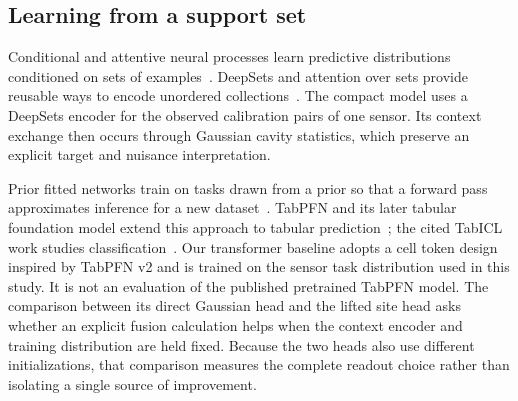 \subsection{Learning from a support set}

Conditional and attentive neural processes learn predictive distributions conditioned on sets of examples~\citep{garnelo2018cnp,kim2019anp}. DeepSets and attention over sets provide reusable ways to encode unordered collections~\citep{zaheer2017deepsets,lee2019settransformer}. The compact model uses a DeepSets encoder for the observed calibration pairs of one sensor. Its context exchange then occurs through Gaussian cavity statistics, which preserve an explicit target and nuisance interpretation.

Prior fitted networks train on tasks drawn from a prior so that a forward pass approximates inference for a new dataset~\citep{muller2022pfn}. TabPFN and its later tabular foundation model extend this approach to tabular prediction~\citep{hollmann2023tabpfn,hollmann2025tabpfnv2}; the cited TabICL work studies classification~\citep{qu2025tabicl}. Our transformer baseline adopts a cell token design inspired by TabPFN v2 and is trained on the sensor task distribution used in this study. It is not an evaluation of the published pretrained TabPFN model. The comparison between its direct Gaussian head and the lifted site head asks whether an explicit fusion calculation helps when the context encoder and training distribution are held fixed. Because the two heads also use different initializations, that comparison measures the complete readout choice rather than isolating a single source of improvement.
